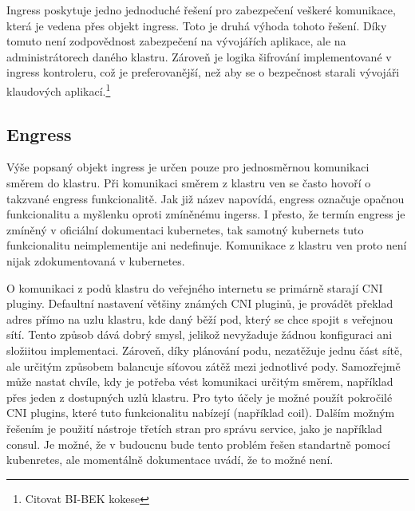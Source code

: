 Ingress poskytuje jedno jednoduché řešení pro zabezpečení veškeré komunikace, která je vedena přes objekt ingress. Toto je druhá výhoda tohoto řešení. Díky tomuto není zodpovědnost zabezpečení na vývojářích aplikace, ale na administrátorech daného klastru. Zároveň je logika šifrování implementované v ingress kontroleru, což je preferovanější, než aby se o bezpečnost starali vývojáři klaudových aplikací.\footnote{Citovat BI-BEK kokese}

\subsection{Engress}
Výše popsaný objekt ingress je určen pouze pro jednosměrnou komunikaci směrem do klastru. Při komunikaci směrem z klastru ven se často hovoří o takzvané engress funkcionalitě. Jak již název napovídá, engress označuje opačnou funkcionalitu a myšlenku oproti zmíněnému ingerss. I přesto, že termín engress je zmíněný v oficiální dokumentaci kubernetes, tak samotný kubernets tuto funkcionalitu neimplementije ani nedefinuje. Komunikace z klastru ven proto není nijak zdokumentovaná v kubernetes.

O komunikaci z podů klastru do veřejného internetu se primárně starají CNI pluginy. Defaultní nastavení většiny známých CNI pluginů, je provádět překlad adres přímo na uzlu klastru, kde daný běží pod, který se chce spojit s veřejnou sítí. Tento způsob dává dobrý smysl, jelikož nevyžaduje žádnou konfiguraci ani složiitou implementaci. Zároveň, díky plánování podu, nezatěžuje jednu část sítě, ale určitým způsobem balancuje síťovou zátěž mezi jednotlivé pody. Samozřejmě může nastat chvíle, kdy je potřeba vést komunikaci určitým směrem, například přes jeden z dostupných uzlů klastru. Pro tyto účely je možné použít pokročilé CNI plugins, které tuto funkcionalitu nabízejí (například coil)\cite{yamamoto_2020_introducing}. Dalším možným řešením je použití nástroje třetích stran pro správu service, jako je například consul. Je možné, že v budoucnu bude tento problém řešen standartně pomocí kubenretes, ale momentálně dokumentace uvádí, že to možné není.\cite{thekubernetesauthors_2022_network}




